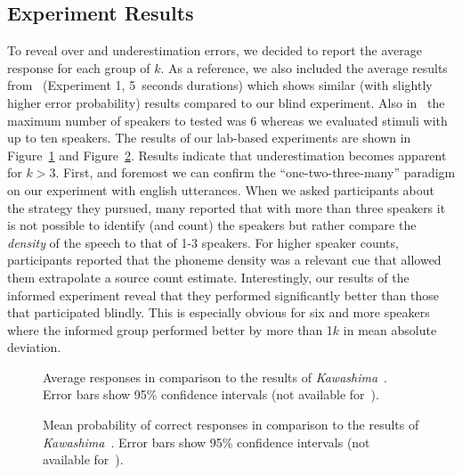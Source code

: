\subsection{Experiment Results}
To reveal over and underestimation errors, we decided to report the average response for each group of \(k\).
As a reference, we also included the average results from~\cite{kawashima15} (Experiment 1, 5~seconds durations) which shows similar (with slightly higher error probability) results compared to our blind experiment.
Also in~\cite{kawashima15} the maximum number of speakers to tested was 6 whereas we evaluated stimuli with up to ten speakers.
The results of our lab-based experiments are shown in Figure~\ref{fig:experimentA} and Figure~\ref{fig:experimentB}.
Results indicate that underestimation becomes apparent for \(k > 3\).
First, and foremost we can confirm the ``one-two-three-many'' paradigm on our experiment with english utterances.
When we asked participants about the strategy they pursued, many reported that with more than three speakers it is not possible to identify (and count) the speakers but rather compare the \emph{density} of the speech to that of 1-3 speakers.
For higher speaker counts, participants reported that the phoneme density was a relevant cue that allowed them extrapolate a source count estimate.
Interestingly, our results of the informed experiment reveal that they performed significantly better than those that participated blindly.
This is especially obvious for six and more speakers where the informed group performed better by more than 1\(k\) in mean absolute deviation.

\begin{figure}[t!]
    \centering
    \begin{adjustbox}{width=0.7\columnwidth}
      
    \end{adjustbox}
    \caption{Average responses in comparison to the results of \emph{Kawashima}~\cite{kawashima15}. Error bars show 95\% confidence intervals (not available for~\cite{kawashima15}).}%
    \label{fig:experimentA}
 \end{figure}

\begin{figure}[t!]
   \centering
   \begin{adjustbox}{width=0.7\columnwidth}
     
   \end{adjustbox}
   \caption{Mean probability of correct responses in comparison to the results of \emph{Kawashima}~\cite{kawashima15}. Error bars show 95\% confidence intervals (not available for~\cite{kawashima15}).}%
   \label{fig:experimentB}
\end{figure}


